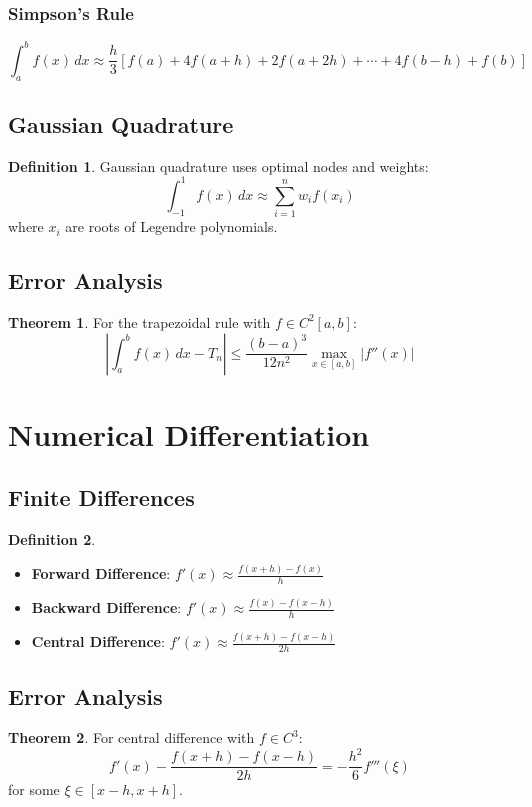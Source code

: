\documentclass[11pt]{article}
\theoremstyle{definition}
\newtheorem{definition}{Definition}[section]
\newtheorem{theorem}{Theorem}[section]
\begin{document}
\subsubsection{Simpson's Rule}
$$\int_a^b f(x) \, dx \approx \frac{h}{3}[f(a) + 4f(a+h) + 2f(a+2h) + \cdots + 4f(b-h) + f(b)]$$

\subsection{Gaussian Quadrature}
\begin{definition}
Gaussian quadrature uses optimal nodes and weights:
$$\int_{-1}^1 f(x) \, dx \approx \sum_{i=1}^n w_i f(x_i)$$
where $x_i$ are roots of Legendre polynomials.
\end{definition}

\subsection{Error Analysis}
\begin{theorem}
For the trapezoidal rule with $f \in C^2[a,b]$:
$$\left|\int_a^b f(x) \, dx - T_n\right| \leq \frac{(b-a)^3}{12n^2} \max_{x \in [a,b]} |f''(x)|$$
\end{theorem}

\section{Numerical Differentiation}

\subsection{Finite Differences}
\begin{definition}
\begin{itemize}
    \item \textbf{Forward Difference}: $f'(x) \approx \frac{f(x+h) - f(x)}{h}$
    \item \textbf{Backward Difference}: $f'(x) \approx \frac{f(x) - f(x-h)}{h}$
    \item \textbf{Central Difference}: $f'(x) \approx \frac{f(x+h) - f(x-h)}{2h}$
\end{itemize}
\end{definition}

\subsection{Error Analysis}
\begin{theorem}
For central difference with $f \in C^3$:
$$f'(x) - \frac{f(x+h) - f(x-h)}{2h} = -\frac{h^2}{6} f'''(\xi)$$
for some $\xi \in [x-h, x+h]$.
\end{theorem}
\end{document}
